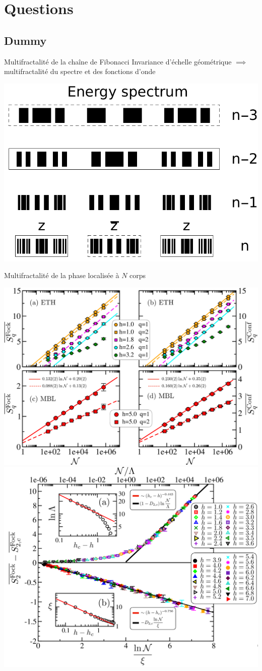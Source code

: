 \section{Questions}
\subsection{Dummy}

\begin{frame}{Multifractalité de la chaîne de Fibonacci}
Invariance d'échelle géométrique $\implies$ multifractalité du spectre et des fonctions d'onde

\centering
\includegraphics[width=0.5\columnwidth]{img/4_questions/recursive_construction_spectrum}
\end{frame}

\begin{frame}{Multifractalité de la phase localisée à $N$ corps}

\centering
\includegraphics[width=0.4\columnwidth]{img/4_questions/scalings}
%
\includegraphics[width=0.4\columnwidth]{img/4_questions/scaling-laws-Fock}

\end{frame}

